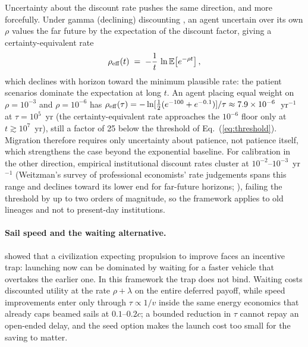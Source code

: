 \documentclass[11pt]{article}
\begin{document}
Uncertainty about the discount rate pushes the same direction, and more forcefully. Under gamma (declining) discounting \citep{Weitzman1998,Weitzman2001}, an agent uncertain over its own $\rho$ values the far future by the expectation of the discount factor, giving a certainty-equivalent rate
\begin{equation}
\rho_{\rm eff}(t) \;=\; -\frac{1}{t}\,\ln \mathbb{E}\!\left[e^{-\rho t}\right],
\label{eq:gamma}
\end{equation}
which declines with horizon toward the minimum plausible rate: the patient scenarios dominate the expectation at long $t$. An agent placing equal weight on $\rho = 10^{-3}$ and $\rho = 10^{-6}$ has $\rho_{\rm eff}(\tau) = -\ln[\tfrac12(e^{-100} + e^{-0.1})]/\tau \approx 7.9\times10^{-6}$~yr$^{-1}$ at $\tau = 10^{5}$~yr (the certainty-equivalent rate approaches the $10^{-6}$ floor only at $t \gtrsim 10^{7}$~yr), still a factor of 25 below the threshold of Eq.~(\ref{eq:threshold}). Migration therefore requires only uncertainty about patience, not patience itself, which strengthens the case beyond the exponential baseline. For calibration in the other direction, empirical institutional discount rates cluster at $10^{-2}$--$10^{-3}$~yr$^{-1}$ (Weitzman's survey of professional economists' rate judgements spans this range and declines toward its lower end for far-future horizons; \citealt{Weitzman2001}), failing the threshold by up to two orders of magnitude, so the framework applies to old lineages and not to present-day institutions.

\paragraph{Sail speed and the waiting alternative.} \citet{Heller2017} showed that a civilization expecting propulsion to improve faces an incentive trap: launching now can be dominated by waiting for a faster vehicle that overtakes the earlier one. In this framework the trap does not bind. Waiting costs discounted utility at the rate $\rho + \lambda$ on the entire deferred payoff, while speed improvements enter only through $\tau \propto 1/v$ inside the same energy economics that already caps beamed sails at $0.1$--$0.2c$; a bounded reduction in $\tau$ cannot repay an open-ended delay, and the seed option makes the launch cost too small for the saving to matter.
\end{document}
